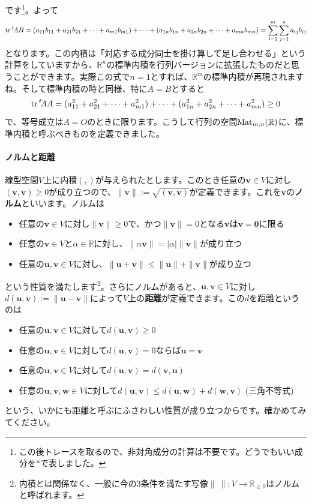 です\footnote{この後トレースを取るので、非対角成分の計算は不要です。どうでもいい成分を$*$で表しました。}。よって
\[
\operatorname{tr} {}^t\!A B
= (a_{11}b_{11} + a_{21}b_{21} + \cdots + a_{m1}b_{m1}) + \cdots + (a_{1n}b_{1n} + a_{2n}b_{2n} + \cdots + a_{mn}b_{mn})
= \sum_{i = 1}^{m} \sum_{j = 1}^n a_{ij}b_{ij}
\]
となります。この内積は「対応する成分同士を掛け算して足し合わせる」という計算をしていますから、$\mathbb{R}^n$の標準内積を行列バージョンに拡張したものだと思うことができます。実際この式で$n = 1$とすれば、$\mathbb{R}^m$の標準内積が再現されますね。そして標準内積の時と同様、特に$A = B$とすると
\[
\operatorname{tr} {}^t\!A A = (a_{11}^2 + a_{21}^2 + \cdots + a_{m1}^2) + \cdots + (a_{1n}^2 + a_{2n}^2 + \cdots + a_{mn}^2) \geq 0
\]
で、等号成立は$A = O$のときに限ります。こうして行列の空間$\operatorname{Mat}_{m, n}(\mathbb{R})$に、標準内積と呼ぶべきものを定義できました。

\paragraph{ノルムと距離} 線型空間$V$上に内積$(, )$が与えられたとします。このとき任意の$\bm{v} \in V$に対し$(\bm{v}, \bm{v}) \geq 0$が成り立つので、$\|\bm{v}\| := \sqrt{(\bm{v}, \bm{v})}$が定義できます。これを$\bm{v}$の\textbf{ノルム}といいます。ノルムは
\begin{itemize}
\item 任意の$\bm{v} \in V$に対し$\|\bm{v}\|\geq 0$で、かつ$\|\bm{v}\| = 0$となる$\bm{v}$は$\bm{v} = \bm{0}$に限る
\item 任意の$\bm{v} \in V$と$\alpha\in\mathbb{R}$に対し、$\|\alpha\bm{v}\| = |\alpha|\|\bm{v}\|$が成り立つ
\item 任意の$\bm{u}, \bm{v} \in V$に対し、$\|\bm{u} + \bm{v}\| \leq \|\bm{u}\| + \|\bm{v}\|$が成り立つ
\end{itemize}
という性質を満たします\footnote{内積とは関係なく、一般に今の$3$条件を満たす写像$\|\ \|\colon V\rightarrow\mathbb{R}_{\geq 0}$はノルムと呼ばれます。}。さらにノルムがあると、$\bm{u}, \bm{v} \in V$に対し$d(\bm{u}, \bm{v}) := \|\bm{u} - \bm{v}\|$によって$V$上の\textbf{距離}が定義できます。この$d$を距離というのは
\begin{itemize}
\item 任意の$\bm{u}, \bm{v} \in V$に対して$d(\bm{u}, \bm{v}) \geq 0$
\item 任意の$\bm{u}, \bm{v} \in V$に対して$d(\bm{u}, \bm{v}) = 0$ならば$\bm{u} = \bm{v}$
\item 任意の$\bm{u}, \bm{v} \in V$に対して$d(\bm{u}, \bm{v}) = d(\bm{v}, \bm{u})$
\item 任意の$\bm{u}, \bm{v}, \bm{w} \in V$に対して$d(\bm{u}, \bm{v}) \leq d(\bm{u}, \bm{w}) +d(\bm{w}, \bm{v})$ (三角不等式)
\end{itemize}
という、いかにも距離と呼ぶにふさわしい性質が成り立つからです。確かめてみてください。


